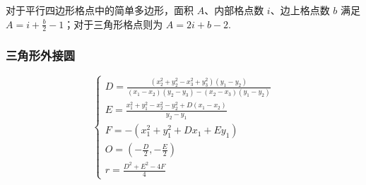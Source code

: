 对于平行四边形格点中的简单多边形，面积 $A$、内部格点数 $i$、边上格点数 $b$ 满足 $A = i + \frac{b}{2} - 1$；对于三角形格点则为 $A = 2i + b - 2$.

\subsubsection{三角形外接圆}

\begin{equation*}
\begin{cases}
D = \frac{(x_2^2+y_2^2-x_3^2+y_3^2)(y_1-y_2)}{(x_1-x_2)(y_2-y_3)-(x_2-x_3)(y_1-y_2)}
\\[10pt]
E = \frac{x_1^2+y_1^2-x_2^2-y_2^2+D(x_1-x_2)}{y_2-y_1}
\\
F = -(x_1^2 + y_1^2 + D x_1 + E y_1)
\\
O = (-\frac{D}{2}, -\frac{E}{2})
\\[10pt]
r = \frac{D^2 + E^2 - 4F}{4}
\end{cases}
\end{equation*}



